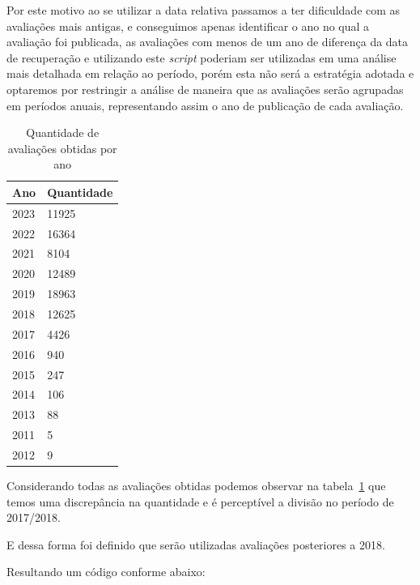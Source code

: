 Por este motivo ao se utilizar a data relativa passamos a ter dificuldade com as avaliações mais antigas, e conseguimos apenas identificar o ano no qual a avaliação foi publicada, as avaliações com menos de um ano de diferença da data de recuperação e utilizando este \textit{script} poderiam ser utilizadas em uma análise mais detalhada em relação ao período, porém esta não será a estratégia adotada e optaremos por restringir a análise de maneira que as avaliações serão agrupadas em períodos anuais, representando assim o ano de publicação de cada avaliação.

\begin{table}[]
	\centering
	\begin{tabular}{|l|l|}
		\hline
		\textbf{Ano} & \textbf{Quantidade} \\\hline
		2023         & 11925               \\
		2022         & 16364               \\
		2021         & 8104                \\
		2020         & 12489               \\
		2019         & 18963               \\
		2018         & 12625               \\
		2017         & 4426                \\
		2016         & 940                 \\
		2015         & 247                 \\
		2014         & 106                 \\
		2013         & 88                  \\
		2011         & 5                   \\
		2012         & 9                   \\
		\hline
	\end{tabular}%
	\caption{Quantidade de avaliações obtidas por ano}
	\label{table:review_per_year}
\end{table}

Considerando todas as avaliações obtidas podemos observar na tabela~\ref{table:review_per_year} que temos uma discrepância na quantidade e é perceptível a divisão no período de 2017/2018.

E dessa forma foi definido que serão utilizadas avaliações posteriores a 2018.

Resultando um código conforme abaixo:



